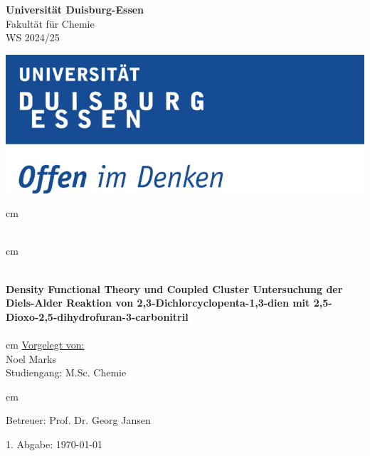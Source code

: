 \thispagestyle{empty}
\begin{center}
\noindent\begin{minipage}{.45\textwidth}
    
     \large\textbf{Universität Duisburg-Essen}\\
     Fakultät für Chemie\\
     WS 2024/25
   
\end{minipage}
\hfill
\begin{minipage}{.45\textwidth}
\includegraphics[width=\textwidth]{Graphik/logo.png}
\end{minipage}
 cm

 \\

 cm

\HRule \\ [0.5cm]
{{\LARGE {\bfseries Density Functional Theory und Coupled Cluster Untersuchung der Diels-Alder Reaktion von 2,3-Dichlorcyclopenta-1,3-dien mit 2,5-Dioxo-2,5-dihydrofuran-3-carbonitril}}} \\[0.2cm] %
\HRule \\[1cm]



 cm
\large {\underline{Vorgelegt von:}}\\ 
Noel Marks \\
Studiengang: M.Sc. Chemie\\ [1cm]

\end{center} 

 cm

\noindent\begin{minipage}{.6\textwidth}
   \begin{flushleft} 
     Betreuer: Prof. Dr. Georg Jansen
   \end{flushleft}
\end{minipage}
\begin{minipage}{.35\textwidth}
    \begin{flushright} 
      1. Abgabe: \today \\
    \end{flushright}    
\end{minipage}